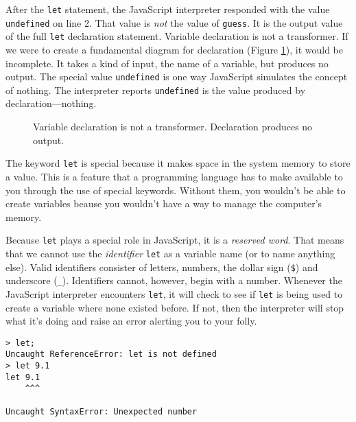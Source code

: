 After the \texttt{let} statement, the JavaScript interpreter responded with the
value \texttt{undefined} on line 2. That value is \textit{not} the value of
\texttt{guess}. It is the output value of the full \texttt{let} declaration
statement. Variable declaration is not a transformer. If we were to create a
fundamental diagram for declaration (Figure
\ref{fig:intro-declaration-fundamental-diagram}), it would be incomplete. It
takes a kind of input, the name of a variable, but produces no output. The
special value \texttt{undefined} is one way JavaScript simulates the concept of
nothing. The interpreter reports \texttt{undefined} is the value produced by
declaration---nothing.

\begin{figure}[h]
  
\caption{\label{fig:intro-declaration-fundamental-diagram}Variable declaration
is not a transformer. Declaration produces no output.}
\end{figure}

The keyword \texttt{let} is special because it makes space in the system memory
to store a value. This is a feature that a programming language has to make
available to you through the use of special keywords. Without them, you wouldn't
be able to create variables beause you wouldn't have a way to manage the
computer's memory.

Because \texttt{let} plays a special role in JavaScript, it is a \emph{reserved
word}. That means that we cannot use the \emph{identifier} \texttt{let} as a
variable name (or to name anything else). Valid identifiers consister of
letters, numbers, the dollar sign (\texttt{\$}) and underscore (\texttt{\_}).
Identifiers cannot, however, begin with a number.  Whenever the JavaScript interpreter encounters \texttt{let}, it will
check to see if \texttt{let} is being used to create a variable where none
existed before. If not, then the interpreter will stop what it's doing and raise
an error alerting you to your folly.

\begin{lstlisting}[caption={\label{listing:intro-let-syntax-error}Several
illegal uses of the keyword \texttt{let}.}]
> let;
Uncaught ReferenceError: let is not defined
> let 9.1
let 9.1
    ^^^

Uncaught SyntaxError: Unexpected number
\end{lstlisting}

